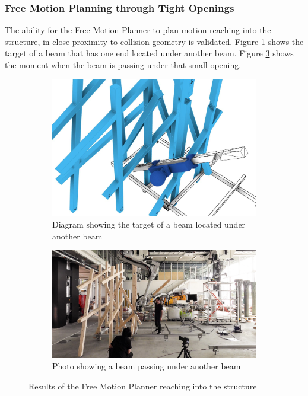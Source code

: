 \FloatBarrier

\subsubsection{Free Motion Planning through Tight Openings}
\label{subsubsection:exploration-2-free-motion-planning-through-tight-openings}

The ability for the Free Motion Planner to plan motion reaching into the structure, in close proximity to collision geometry is validated. Figure \ref{fig:target-under-another-beam} shows the  target of a beam that has one end located under another beam. Figure \ref{fig:target-under-another-beam-photo} shows the moment when the beam is passing under that small opening. 

\begin{figure}[!h]
    \centering
    \begin{subfigure}[b]{0.40\textwidth}
        \centering
        \includegraphics[width=\textwidth]{images/05/image75.jpg}
        \caption{Diagram showing the target of a beam located under another beam}
        \label{fig:target-under-another-beam}
    \end{subfigure}
    \hfill
    \begin{subfigure}[b]{0.58\textwidth}
        \centering
        \includegraphics[width=\textwidth]{images/05/image71.jpg}
        \caption{Photo showing a beam passing under another beam}
        \label{fig:target-under-another-beam-photo}
    \end{subfigure}
    \caption{Results of the Free Motion Planner reaching into the structure}
\end{figure}

